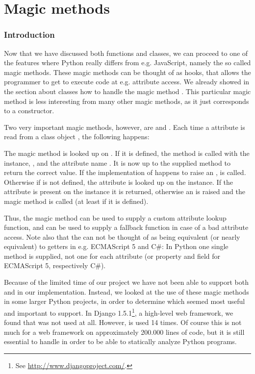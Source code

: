 \chapter{Magic methods}
\subsection{Introduction}
Now that we have discussed both functions and classes, we can proceed to one of the features where Python really differs from e.g. JavaScript, namely the so called magic methods. These magic methods can be thought of as hooks, that allows the programmer to get to execute code at e.g. attribute access. We already showed in the section about classes how to handle the magic method . This particular magic method is less interesting from many other magic methods, as it just corresponds to a constructor.

Two very important magic methods, however, are  and . Each time a attribute  is read from a class object , the following happens:

The magic method  is looked up on . If it is defined, the method is called with the instance, , and the attribute name . It is now up to the supplied method to return the correct value. If the implementation of  happens to raise an ,  is called. Otherwise if  is not defined, the attribute is looked up on the instance. If the attribute is present on the instance it is returned, otherwise an  is raised and the magic method  is called (at least if it is defined).

Thus, the magic method  can be used to supply a custom attribute lookup function, and  can be used to supply a fallback function in case of a bad attribute access. Note also that the  can not be thought of as being equivalent (or nearly equivalent) to getters in e.g. ECMAScript 5 and C\#: In Python one single method is supplied, not one for each attribute (or property and field for ECMAScript 5, respectively C\#).

Because of the limited time of our project we have not been able to support both  and  in our implementation. Instead, we looked at the use of these magic methods in some larger Python projects, in order to determine which seemed most useful and important to support. In Django 1.5.1\footnote{See \url{http://www.djangoproject.com/}.}, a high-level web framework, we found that  was not used at all. However,  is used 14 times. Of course this is not much for a web framework on approximately 200.000 lines of code, but it is still essential to handle in order to be able to statically analyze Python programs.

